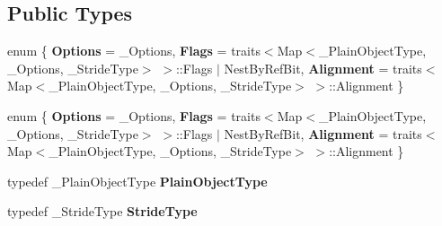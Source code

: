 \subsection*{Public Types}
\begin{DoxyCompactItemize}
\item 
\mbox{\label{struct_eigen_1_1internal_1_1traits_3_01_ref_3_01___plain_object_type_00_01___options_00_01___stride_type_01_4_01_4_a46557c8a1bc377f68b108c97fc4477f0}} 
enum \{ {\bfseries Options} = \+\_\+\+Options, 
{\bfseries Flags} = traits$<$Map$<$\+\_\+\+Plain\+Object\+Type, \+\_\+\+Options, \+\_\+\+Stride\+Type$>$ $>$\+:\+:Flags $\vert$ Nest\+By\+Ref\+Bit, 
{\bfseries Alignment} = traits$<$Map$<$\+\_\+\+Plain\+Object\+Type, \+\_\+\+Options, \+\_\+\+Stride\+Type$>$ $>$\+:\+:Alignment
 \}
\item 
\mbox{\label{struct_eigen_1_1internal_1_1traits_3_01_ref_3_01___plain_object_type_00_01___options_00_01___stride_type_01_4_01_4_ad71a7c331313e9e8c61e04a478713026}} 
enum \{ {\bfseries Options} = \+\_\+\+Options, 
{\bfseries Flags} = traits$<$Map$<$\+\_\+\+Plain\+Object\+Type, \+\_\+\+Options, \+\_\+\+Stride\+Type$>$ $>$\+:\+:Flags $\vert$ Nest\+By\+Ref\+Bit, 
{\bfseries Alignment} = traits$<$Map$<$\+\_\+\+Plain\+Object\+Type, \+\_\+\+Options, \+\_\+\+Stride\+Type$>$ $>$\+:\+:Alignment
 \}
\item 
\mbox{\label{struct_eigen_1_1internal_1_1traits_3_01_ref_3_01___plain_object_type_00_01___options_00_01___stride_type_01_4_01_4_a1a891225ab7bc2b909fe009cb15af8ca}} 
typedef \+\_\+\+Plain\+Object\+Type {\bfseries Plain\+Object\+Type}
\item 
\mbox{\label{struct_eigen_1_1internal_1_1traits_3_01_ref_3_01___plain_object_type_00_01___options_00_01___stride_type_01_4_01_4_a3d87abd458a368ce0a3ec13e4c90667a}} 
typedef \+\_\+\+Stride\+Type {\bfseries Stride\+Type}
\item 
\mbox{\label{struct_eigen_1_1internal_1_1traits_3_01_ref_3_01___plain_object_type_00_01___options_00_01___stride_type_01_4_01_4_a1a891225ab7bc2b909fe009cb15af8ca}} 

\end{DoxyCompactItemize}
